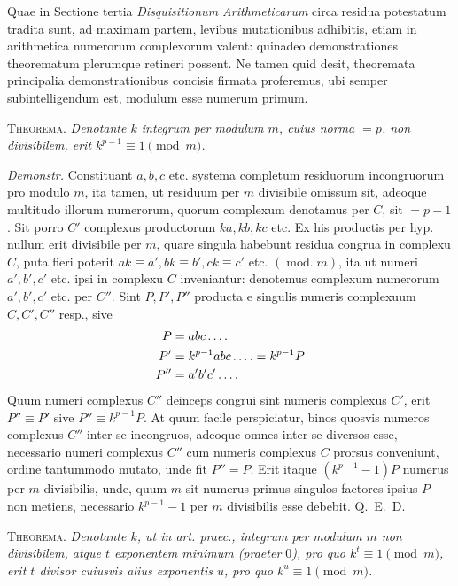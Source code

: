 %
Quae in Sectione tertia \emph{Disquisitionum Arithmeticarum} circa residua potestatum tradita sunt, ad maximam partem, levibus mutationibus adhibitis, etiam in arithmetica numerorum complexorum valent: quinadeo demonstrationes theorematum plerumque retineri possent. Ne tamen quid desit, theoremata principalia demonstrationibus concisis firmata proferemus, ubi semper subintelligendum est, modulum esse numerum primum.

\textsc{Theorema.} \emph{Denotante $k$ integrum per modulum $m$, cuius norma $=p$, non divisibilem, erit $k^{p-1}\equiv1\pmod m$.}

\emph{Demonstr.} Constituant $a,b,c$ etc. systema completum residuorum incongruorum pro modulo $m$, ita tamen, ut residuum per $m$ divisibile omissum sit, adeoque multitudo illorum numerorum, quorum complexum denotamus per $C$, sit $=p-1$. Sit porro $C'$ complexus productorum $ka,kb,kc$ etc. Ex his productis per hyp. nullum erit divisibile per $m$, quare singula habebunt residua congrua in complexu $C$, puta fieri poterit $ak\equiv a',bk\equiv b',ck\equiv c'$ etc. $(\operatorname{mod.}m)$, ita ut numeri $a',b',c'$ etc. ipsi in complexu $C$ inveniantur: denotemus complexum numerorum $a',b',c'$ etc. per $C''$. Sint $P,P',P''$ producta e singulis numeris complexuum $C,C',C''$ resp., sive
\[
\begin{aligned}
P&=abc\mathinner{.\,.\,.\,.}\\
P'&=k^{p-1}abc\mathinner{.\,.\,.\,.}=k^{p-1}P\\
P''&=a'b'c'\mathinner{.\,.\,.\,.}
\end{aligned}
\]
Quum numeri complexus $C''$ deinceps congrui sint numeris complexus $C'$, erit $P''\equiv P'$ sive $P''\equiv k^{p-1}P$. At quum facile perspiciatur, binos quosvis numeros complexus $C''$ inter se incongruos, adeoque omnes inter se diversos esse, necessario numeri complexus $C''$ cum numeris complexus $C$ prorsus conveniunt, ordine tantummodo mutato, unde fit $P''=P$. Erit itaque $(k^{p-1}-1)P$ numerus per $m$ divisibilis, unde, quum $m$ sit numerus primus singulos factores ipsius $P$ non metiens, necessario $k^{p-1}-1$ per $m$ divisibilis esse debebit. Q.~E.~D.

\textsc{Theorema.} \emph{Denotante $k$, ut in art. praec., integrum per modulum $m$ non divisibilem, atque $t$ exponentem minimum (praeter $0$), pro quo $k^t\equiv1\pmod m$, erit $t$ divisor cuiusvis alius exponentis $u$, pro quo $k^u\equiv1\pmod m$.}

